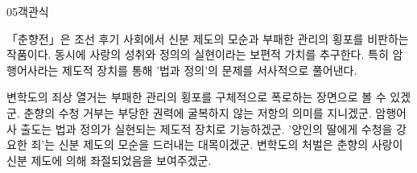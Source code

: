 \documentclass[fs85,seriesWit]{korfarm-base}
\begin{document}
\begin{kfQBlock}{05}{객관식}
\begin{kfEvidence}「춘향전」은 조선 후기 사회에서 신분 제도의 모순과 부패한 관리의 횡포를 비판하는 작품이다. 동시에 사랑의 성취와 정의의 실현이라는 보편적 가치를 추구한다. 특히 암행어사라는 제도적 장치를 통해 '법과 정의'의 문제를 서사적으로 풀어낸다.\end{kfEvidence}
\begin{kfChoices}
\kfChoice 변학도의 죄상 열거는 부패한 관리의 횡포를 구체적으로 폭로하는 장면으로 볼 수 있겠군.
\kfChoice 춘향의 수청 거부는 부당한 권력에 굴복하지 않는 저항의 의미를 지니겠군.
\kfChoice 암행어사 출도는 법과 정의가 실현되는 제도적 장치로 기능하겠군.
\kfChoice '양인의 딸에게 수청을 강요한 죄'는 신분 제도의 모순을 드러내는 대목이겠군.
\kfChoice 변학도의 처벌은 춘향의 사랑이 신분 제도에 의해 좌절되었음을 보여주겠군.
\end{kfChoices}
\end{kfQBlock}

\kfEndMC
\end{document}
